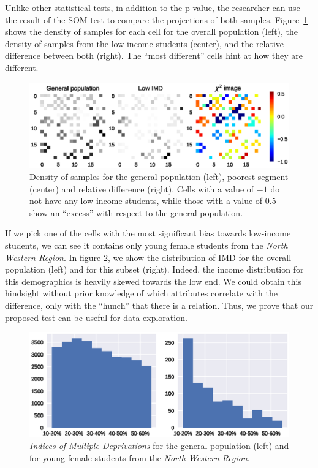 Unlike other statistical tests, in addition to the p-value, the researcher can use
the result of the \gls{SOM}  test to compare the projections of both samples.
Figure~\ref{fig:oulad_grid} shows the density of samples for each cell for the overall population
(left), the density of samples from the low-income students (center), and the relative difference
between both (right). The ``most different'' cells hint at how they are different.

\begin{figure}[t]
    \centering
    \includegraphics[width=\textwidth]{images/6_som/imd.eps}
    \caption[Comparing  density variations.]{Density of samples for the general population (left), poorest segment (center) and
    relative difference (right). Cells with a value of $-1$ do not have any low-income students,
    while those with a value of $0.5$ show an ``excess'' with respect to the general
    population.}
    \label{fig:oulad_grid}
\end{figure}

If we pick one of the cells with the most significant bias towards low-income students,
we can see it contains only young female students from the \emph{North Western Region}.
In figure \ref{fig:oulad_hist}, we show the distribution of \gls{IMD} for the overall population (left)
and for this subset (right). Indeed, the income distribution for this demographics is
heavily skewed towards the low end. We could obtain this hindsight without prior knowledge of which
attributes correlate with the difference, only with the ``hunch'' that
there is a relation. Thus, we prove that our proposed test can be useful for data exploration.

\begin{figure}[htbp]
    \centering
    \includegraphics[width=\textwidth]{images/6_som/imd_histogram.eps}
    \caption[Histogram of the  for two populations.]{
        \emph{Indices of Multiple Deprivations} for the general population (left) and for
        young female students from the \emph{North Western Region}.
    }
    \label{fig:oulad_hist}
\end{figure}

